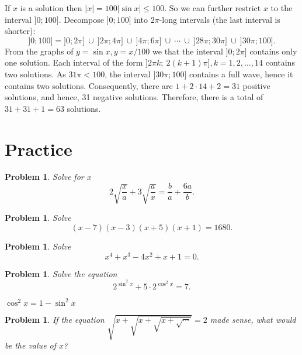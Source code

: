 \documentclass[11pt, openany]{book}
\theoremstyle{change} \theoremheaderfont{\blue\sffamily\bfseries}
\newtheorem{pro}[thm]{Problem}
\theoremstyle{nonumberplain} \theoremheaderfont{\sffamily\bfseries}
\newcommand{\dis}{\displaystyle}
\newcommand{\í}{\'{\i}}
\begin{document}
If $x$ is a solution then $|x| = 100|\sin x| \leq 100$. So we can
further restrict $x$ to the interval $]0; 100].$ Decompose  $]0;
100]$ into  $2\pi$-long  intervals (the last interval is shorter):
$$]0; 100] = ]0; 2\pi ]\  \cup \ ]2\pi ; 4\pi ]\ \cup \ ]4\pi ; 6\pi ]\ \cup\  \cdots \ \cup \ ]28\pi ; 30\pi]\  \cup\ ]30\pi ; 100].$$
From the graphs of  $y = \sin x, y = x/100$ we that the interval
$]0; 2\pi]$ contains only one solution. Each interval of the form
$]2\pi k;\ 2(k+ 1)\pi ], k = 1, 2, \ldots , 14$ contains two
solutions. As $31\pi < 100$, the interval $]30\pi ; 100]$ contains
a full wave, hence it contains two solutions. Consequently, there
are $1 + 2\cdot 14 + 2 = 31$ positive solutions, and hence, 31
negative solutions. Therefore, there is a total of $31 + 31 + 1 =
63$ solutions.

\section*{Practice}\begin{multicols}{2}\columnseprule 1pt \columnsep 25pt


\begin{pro} Solve for $x$ $$2\sqrt{\frac{x}{a}} + 3\sqrt{\frac{a}{x}} = \frac{b}{a} + \frac{6a}{b}.$$
\end{pro}
\begin{pro} Solve $$(x - 7)(x - 3)(x + 5)(x + 1) = 1680.$$ \end{pro}
\begin{pro}Solve $$x^4 + x^3 - 4x^2 + x + 1 = 0.$$ \end{pro}
\begin{pro} Solve the equation
$$2^{\sin ^2x} + 5\cdot 2^{\cos ^2x} = 7.$$
\begin{answer} $\cos ^2 x = 1 - \sin ^2 x$\end{answer}
\end{pro}
\begin{pro} If the equation
$\dis{\sqrt{x + \sqrt{x + \sqrt{x + \sqrt{\cdots}}}} = 2}$ made
sense, what would be the value of $x$?

\end{pro}


\end{multicols}
\end{document}
